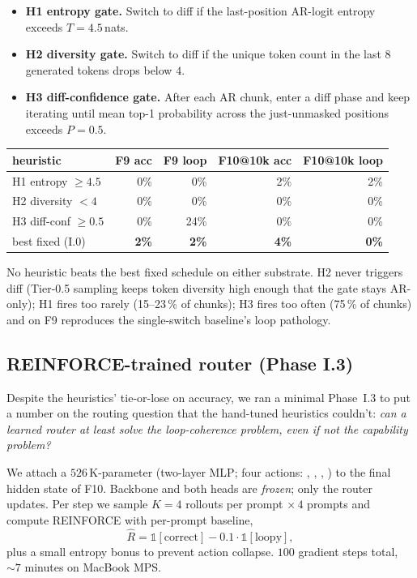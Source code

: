 \begin{itemize}
  \setlength\itemsep{2pt}
  \item \textbf{H1 entropy gate.} Switch to diff if the last-position
        AR-logit entropy exceeds $T = 4.5$\,nats.
  \item \textbf{H2 diversity gate.} Switch to diff if the unique token
        count in the last 8 generated tokens drops below $4$.
  \item \textbf{H3 diff-confidence gate.} After each AR chunk, enter a
        diff phase and keep iterating until mean top-1 probability
        across the just-unmasked positions exceeds $P = 0.5$.
\end{itemize}

\begin{center}
\begin{tabular}{lrrrr}
\toprule
heuristic & F9 acc & F9 loop & F10@10k acc & F10@10k loop \\
\midrule
H1 entropy $\ge 4.5$ & 0\% & 0\% & 2\% & 2\% \\
H2 diversity $< 4$ & 0\% & 0\% & 0\% & 0\% \\
H3 diff-conf $\ge 0.5$ & 0\% & 24\% & 0\% & 0\% \\
\midrule
best fixed (I.0) & \textbf{2\%} & \textbf{2\%} & \textbf{4\%} & \textbf{0\%} \\
\bottomrule
\end{tabular}
\end{center}

No heuristic beats the best fixed schedule on either substrate. H2
never triggers diff (Tier-0.5 sampling keeps token diversity high
enough that the gate stays AR-only); H1 fires too rarely (15--23\,\%
of chunks); H3 fires too often (75\,\% of chunks) and on F9
reproduces the single-switch baseline's loop pathology.

\subsection{REINFORCE-trained router (Phase I.3)}
\label{sec:phase-i3}

Despite the heuristics' tie-or-lose on accuracy, we ran a minimal
Phase~I.3 to put a number on the routing question that the
hand-tuned heuristics couldn't: \emph{can a learned router at least
solve the loop-coherence problem, even if not the capability problem?}

We attach a $526$\,K-parameter  (two-layer MLP; four
actions: , , ,
) to the final hidden state of F10. Backbone and both
heads are \emph{frozen}; only the router updates. Per step we sample
$K=4$ rollouts per prompt $\times\,4$ prompts and compute REINFORCE
with per-prompt baseline,
\[
  \hat{R} = \mathbb{1}[\text{correct}] - 0.1\cdot\mathbb{1}[\text{loopy}],
\]
plus a small entropy bonus to prevent action collapse. $100$
gradient steps total, $\sim 7$ minutes on MacBook MPS.

